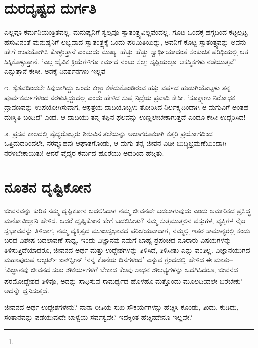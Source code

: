 \section{ದುರದೃಷ್ಟದ ದುರ್ಗತಿ}

ಎಲ್ಲವೂ ಕರ್ಮನಿಯಂತ್ರಿತವಲ್ಲ. ಮನುಷ್ಯನಿಗೆ ಸ್ವಲ್ಪವೂ ಸ್ವಾತಂತ್ರ್ಯವಿಲ್ಲವೆಂದಲ್ಲ. ಗೂಟ ಒಂದಕ್ಕೆ ಹಗ್ಗದಿಂದ ಕಟ್ಟಲ್ಪಟ್ಟ ಹಸುವಿನಂತೆ ಮನುಷ್ಯನಿಗೆ ಲಭ್ಯವಾದ ಸ್ವಾತಂತ್ರ್ಯಕ್ಕೆ ಒಂದು ಪರಿಮಿತಿಯಿದ್ದು, ಅವನಿಗೆ ಕೊಟ್ಟ ಸ್ವಾತಂತ್ರ್ಯವನ್ನು ಅವನು ಹೇಗೆ ಉಪಯೋಗಿಸಿ ಕೊಳ್ಳುತ್ತಾನೆ ಎಂಬುದು ಮುಖ್ಯ. ಹೆಚ್ಚು ಹೆಚ್ಚು ಸ್ವಾರ್ಥಿಯಾದಂತೆ ಸಂಕುಚಿತ ಪರಿಧಿಯಲ್ಲಿ ಆತ ಸಿಕ್ಕಿಕೊಳ್ಳುತ್ತಾನೆ. ‘ಎಲ್ಲ ಜೈವಿಕ ಕ್ರಿಯೆಗಳಿಗೂ ಕರ್ಮದ ನಂಟು ಸಲ್ಲ; ಸೃಷ್ಟಿಯಲ್ಲೂ ಆಕಸ್ಮಿಕಗಳು ನಡೆಯುತ್ತವೆ’ ಎನ್ನುತ್ತಾನೆ ಕೇಸೀ. ಅದಕ್ಕೆ ನಿದರ್ಶನಗಳು ಇಲ್ಲಿವೆ–

೧. ಶೈಶವದಿಂದಲೇ ಕಿವುಡಾಗಿದ್ದು ಒಂದು ಕಣ್ಣು ಕಳೆದುಕೊಂಡಿರುವ ಹತ್ತು ವರ್ಷದ ಹುಡುಗಿಯೊಬ್ಬಳು ತನ್ನ ಪೂರ್ವಕರ್ಮಗಳಿಂದ ನರಳುತ್ತಿದ್ದುದಲ್ಲ ಎಂದು ಹೇಳಿದ ಸುಪ್ತ ನಿದ್ರೆಯ ಪ್ರವಾದಿ ಕೇಸೀ. ‘ಸೂಕ್ಷ್ಮಾಣು ನಿರೋಧಕ ದ್ರಾವಣವನ್ನು ಉಪಯೋಗಿಸುವಾಗ, ಆಸ್ಪತ್ರೆಯ ದಾದಿಯೊಬ್ಬಳು ತೋರಿಸಿದ ನಿರ್ಲಕ್ಷ್ಯದಿಂದಾಗಿ ಆ ಮಗುವಿಗೆ ಅಂತಹ ದುಃಸ್ಥಿತಿ ಬಂದಿದೆ’ ಎಂದ. ಆ ದಾದಿಯು ತನ್ನ ತಪ್ಪಿನ ಫಲವನ್ನು ಉಣ್ಣಲೇಬೇಕಾಗುತ್ತದೆ ಎಂದೂ ಕೇಸೀ ಉದ್ಗರಿಸಿದ!

೨. ಪ್ರಸವ ಕಾಲದಲ್ಲಿ ವೈದ್ಯರೊಬ್ಬರು ಶಿಶುವಿನ ತಲೆಯನ್ನು ಅಜಾಗರೂಕರಾಗಿ ಕತ್ತರಿ ಪ್ರಯೋಗದಿಂದ ಒತ್ತಿದುದರಿಂದಲೇ, ನರವ್ಯೂಹವು ಆಘಾತಗೊಂಡು, ಆ ಮಗು ತನ್ನ ಜೀವನ ವಿಡೀ ಬುದ್ಧಿಭ್ರಮಣೆಯಿಂದಾಗಿ ನರಳಬೇಕಾಯಿತು! ಆದರೆ ವೈದ್ಯರ ಕರ್ಮದ ಹೊರೆಯು ಅದರಿಂದ ಹೆಚ್ಚಿತು.


\section{ನೂತನ ದೃಷ್ಟಿಕೋನ}

ಜೀವನವನ್ನು ಕುರಿತ ನಮ್ಮ ದೃಷ್ಟಿಕೋನ ಬದಲಿಸಿದಾಗ ನಮ್ಮ ಜೀವನವೇ ಬದಲಾಗುವುದು ಎಂದು ಅಮೇರಿಕದ ಪ್ರಸಿದ್ಧ ಮನೋವಿಜ್ಞಾನಿ ಹೇಳಿದ. ಆದರೆ ದೃಷ್ಟಿಕೋನ ಹೇಗೆ ಬದಲಿಸೀತು? ನಮ್ಮ ಸುತ್ತಮುತ್ತಲಿನ ವಸ್ತುಗಳ, ವ್ಯಕ್ತಿಗಳ ನೈಜ ಸ್ವಭಾವವನ್ನು ತಿಳಿದಾಗ, ನಮ್ಮ ವ್ಯಕ್ತಿತ್ವದ ಮೂಲಸ್ವಭಾವದ ಪರಿಚಯವಾದಾಗ, ನಮ್ಮಲ್ಲಿ ಇತರ ಸಾಮಾನ್ಯರಲ್ಲಿ ಕಂಡು ಬರದ ವಿಶೇಷ ಬದಲಾವಣೆ ಸಾಧ್ಯ. ಇಂದು ವಿಜ್ಞಾನವು ನಮಗೆ ಬಾಹ್ಯ ಪ್ರಪಂಚದ ನೂರಾರು ವಿಷಯಗಳನ್ನು ತಿಳಿಸುತ್ತಿದೆಯಾದರೂ, ಜೀವನದ ಅರ್ಥ ಮತ್ತು ಉದ್ದೇಶಗಳನ್ನು ತಿಳಿಸಿದೆ, ತಿಳಿಸೀತು ಎನ್ನು ವಂತಿಲ್ಲ. ವಿಜ್ಞಾನಯುಗದ ಮಹಾಪುರುಷ ಆಲ್ಬರ್ಟ್ ಐನ್​ಸ್ಟೀನ್ ‘ನನ್ನ ಕೊನೆಯ ದಿನಗಳಿಂದ’ ಎನ್ನುವ ಗ್ರಂಥದಲ್ಲಿ ಹೇಳಿದ ಈ ಮಾತು– ‘ವಿಜ್ಞಾನವು ಜೀವನದ ಸುಖ ಸೌಕರ್ಯಗಳಿಗೆ ಬೇಕಾದ ಕೆಲವು ಸಾಧನ ಸೌಲಭ್ಯಗಳನ್ನು ಒದಗಿಸಿದರೂ, ಜೀವನದ ಪರಮೋದ್ದೇಶದ ತಿಳಿವೂ, ಅದನ್ನು ಸಾಧಿಸುವ ಸಾಮರ್ಥ್ಯದ ಹೊಳಹೂ ಮತ್ತೊಂದು ಮೂಲದಿಂದಲೇ ಬರಬೇಕು’\footnote{\hfill{}} ಅದನ್ನೇ ಧ್ವನಿಸುತ್ತದೆ.

ಜೀವನದ ಅರ್ಥ ಉದ್ದೇಶಗಳೇನು? ನಾನಾ ರೀತಿಯ ಸುಖ ಸೌಕರ್ಯಗಳನ್ನು ಹೆಚ್ಚಿಸಿ ಕೊಂಡು, ತಿಂದು, ಕುಡಿದು, ಸಂತಾನವನ್ನು ಪಡೆಯುವುದೇ ಬಾಳ್ವೆಯ ಸರ್ವಸ್ವವೇ? ಇದಕ್ಕಿಂತ ಹೆಚ್ಚಿನದೇನೂ ಇಲ್ಲವೇ?


